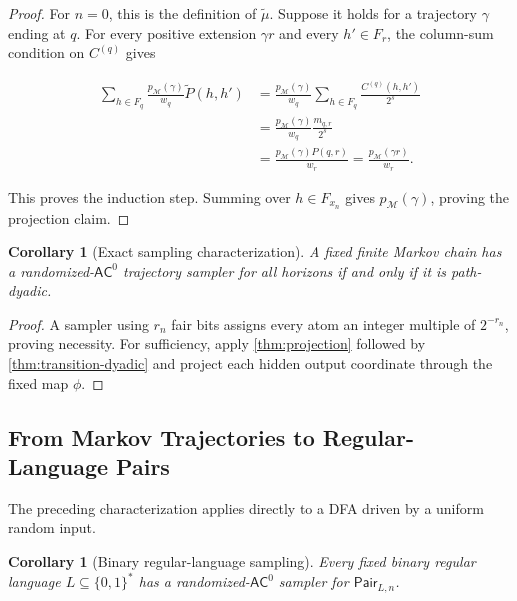 \documentclass[10pt]{article}
\newtheorem{corollary}[theorem]{Corollary}
\theoremstyle{definition}
\newcommand{\AC}{\mathsf{AC}}
\newcommand{\Pair}{\mathsf{Pair}}
\newcommand{\bits}{\{0,1\}}
\begin{document}
\begin{proof}
For $n=0$, this is the definition of $\widetilde\mu$.  Suppose it holds for a
trajectory $\gamma$ ending at $q$.  For every positive extension $\gamma r$
and every $h'\in F_r$, the column-sum condition on $C^{(q)}$ gives

\begin{align}
 \sum_{h\in F_q}\frac{p_{\mathcal M}(\gamma)}{w_q}
       \widetilde P(h,h')
 &=
  \frac{p_{\mathcal M}(\gamma)}{w_q}
  \sum_{h\in F_q}\frac{C^{(q)}(h,h')}{2^s}\\
 &=\frac{p_{\mathcal M}(\gamma)}{w_q}
   \frac{m_{q,r}}{2^s}\\
 &=\frac{p_{\mathcal M}(\gamma)P(q,r)}{w_r}
 =\frac{p_{\mathcal M}(\gamma r)}{w_r}.
\end{align}

This proves the induction step.  Summing over $h\in F_{x_n}$ gives
$p_{\mathcal M}(\gamma)$, proving the projection claim.
\end{proof}

\begin{corollary}[Exact sampling characterization]
\label{cor:characterization}
A fixed finite Markov chain has a randomized-$\AC^0$ trajectory sampler for
all horizons if and only if it is path-dyadic.
\end{corollary}

\begin{proof}
A sampler using $r_n$ fair bits assigns every atom an integer multiple of
$2^{-r_n}$, proving necessity.  For sufficiency, apply
\cref{thm:projection} followed by \cref{thm:transition-dyadic} and project each
hidden output coordinate through the fixed map $\phi$.
\end{proof}

\subsection{From Markov Trajectories to Regular-Language Pairs}
\label{sec:regular}

The preceding characterization applies directly to a DFA driven by a uniform
random input.

\begin{corollary}[Binary regular-language sampling]
\label{cor:regular}
Every fixed binary regular language $L\subseteq\bits^*$ has a
randomized-$\AC^0$ sampler for $\Pair_{L,n}$.
\end{corollary}
\end{document}
